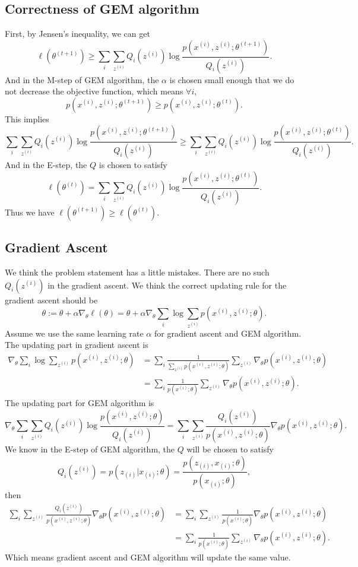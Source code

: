 \documentclass{article}
\begin{document}
\subsection{Correctness of GEM algorithm}
First, by Jensen's inequality, we can get $$\ell(\theta^{(t+1)})\ge\sum_i\sum_{z^{(i)}}Q_i(z^{(i)})\log \frac{p(x^{(i)},z^{(i)};\theta^{(t+1)})}{Q_i(z^{(i)})}.$$ And in the M-step of GEM algorithm, the $\alpha$ is chosen small enough that we do not decrease
the objective function, which means $\forall i$, $$p(x^{(i)},z^{(i)};\theta^{(t+1)}) \ge p(x^{(i)},z^{(i)};\theta^{(t)}).$$ This implies $$\sum_i\sum_{z^{(i)}}Q_i(z^{(i)})\log \frac{p(x^{(i)},z^{(i)};\theta^{(t+1)})}{Q_i(z^{(i)})} \ge \sum_i\sum_{z^{(i)}}Q_i(z^{(i)})\log \frac{p(x^{(i)},z^{(i)};\theta^{(t)})}{Q_i(z^{(i)})}.$$ And in the E-step, the $Q$ is chosen to satisfy $$\ell(\theta^{(t)})=\sum_i\sum_{z^{(i)}}Q_i(z^{(i)})\log \frac{p(x^{(i)},z^{(i)};\theta^{(t)})}{Q_i(z^{(i)})}.$$ Thus we have $\ell(\theta^{(t+1)})\ge\ell(\theta^{(t)})$.

\subsection{Gradient Ascent}
We think the problem statement has a little mistakes. There are no such $Q_i(z^{(i)})$ in the gradient ascent. We think the correct updating rule for the gradient ascent should be $$\theta:=\theta+\alpha\nabla_\theta\ell(\theta) =\theta+\alpha\nabla_\theta\sum_i\log\sum_{z^{(i)}}p(x^{(i)},z^{(i)};\theta).$$
Assume we use the same learning rate $\alpha$ for gradient ascent and GEM algorithm. The updating part in gradient ascent is
\begin{align*}
\nabla_\theta\sum_i\log\sum_{z^{(i)}}p(x^{(i)},z^{(i)};\theta)&=
\sum_i\frac{1}{\sum_{z^{(i)}}p(x^{(i)},z^{(i)};\theta)} \sum_{z^{(i)}}\nabla_\theta p(x^{(i)},z^{(i)};\theta) \\
&=\sum_i\frac{1}{p(x^{(i)};\theta)}\sum_{z^{(i)}}\nabla_\theta p(x^{(i)},z^{(i)};\theta).
\end{align*}
The updating part for GEM algorithm is $$\nabla_\theta\sum_i\sum_{z^{(i)}}Q_i(z^{(i)})\log \frac{p(x^{(i)},z^{(i)};\theta)}{Q_i(z^{(i)})}=
\sum_i\sum_{z^{(i)}}\frac{Q_i(z^{(i)})}{p(x^{(i)},z^{(i)};\theta)} \nabla_\theta p(x^{(i)},z^{(i)};\theta).$$ We know in the E-step of GEM algorithm, the $Q$ will be chosen to satisfy $$Q_i(z^{(i)})=p(z_{(i)}|x_{(i)};\theta)= \frac{p(z_{(i)},x_{(i)};\theta)}{p(x_{(i)};\theta)},$$ then
\begin{align*}
\sum_i\sum_{z^{(i)}}\frac{Q_i(z^{(i)})}{p(x^{(i)},z^{(i)};\theta)} \nabla_\theta p(x^{(i)},z^{(i)};\theta)&=
\sum_i\sum_{z^{(i)}}\frac{1}{p(x^{(i)};\theta)} \nabla_\theta p(x^{(i)},z^{(i)};\theta) \\
&=\sum_i\frac{1}{p(x^{(i)};\theta)}\sum_{z^{(i)}}\nabla_\theta p(x^{(i)},z^{(i)};\theta).
\end{align*}
Which means gradient ascent and GEM algorithm will update the same value.
\end{document}
